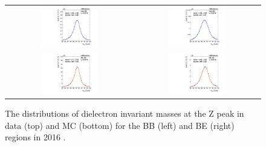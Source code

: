 \begin{figure}[ht]
  \begin{center}
    \begin{tabular}{cc}
      \includegraphics[width=0.48\textwidth]{figures/Zprime/2016/mass_resolution/h_mee_data_BB_2016_Moriond17.pdf} &
      \includegraphics[width=0.48\textwidth]{figures/Zprime/2016/mass_resolution/h_mee_data_BE_2016_Moriond17.pdf} \\
      \includegraphics[width=0.48\textwidth]{figures/Zprime/2016/mass_resolution/h_mee_MC_BB_2016_Moriond17.pdf} &
      \includegraphics[width=0.48\textwidth]{figures/Zprime/2016/mass_resolution/h_mee_MC_BE_2016_Moriond17.pdf}
    \end{tabular}
    \caption{The distributions of dielectron invariant masses at the Z peak in data (top) and MC (bottom) for the BB (left) and BE (right) regions in 2016 \cite{CMS-AN-2016-404}.
    \label{fig:data_MC_peak_2016}}
  \end{center}
\end{figure}

